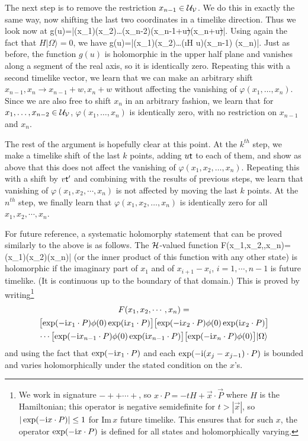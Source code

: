 \documentclass[12pt]{article}
\def\ra{\rangle}
\numberwithin{equation}{section}
\begin{document}
The next step is to remove the restriction $x_{n-1}\in{\mathcal U}_{\mathcal V}$.   We do this in exactly the same way, now shifting the last two coordinates
in a timelike direction.  Thus  we look now at
\be\label{urfu}g(u)=\langle\chi|\phi(x_1)\phi(x_2)\dots \phi(x_{n-2})\phi(x_{n-1}+u\st)\phi(x_n+u\st)|\Omega\rangle.\ee
Using again the fact that $H|\Omega\rangle=0$, we have
\be\label{rfu}g(u)=\langle\chi|\phi(x_1)\phi(x_2)\dots \exp(\i H u)\phi(x_{n-1}) \phi(x_n)|\Omega\rangle .\ee
Just as before, the function $g(u)$ is holomorphic in the upper half plane and vanishes along a segment of the real axis, so it is
identically zero.  Repeating this with a second timelike vector, we learn that we can make an arbitrary shift $x_{n-1},x_n
\to x_{n-1}+w,x_n+w$ without  affecting the vanishing of $\varphi(x_1,\dots,x_n)$.  Since we are also free to shift $x_n$ in an arbitrary
fashion, we learn that for $x_1,\dots,x_{n-2}\in {\mathcal U}_{\mathcal V}$, $\varphi(x_1,\dots,x_{n})$ is identically zero, with no restriction on $x_{n-1}$ and $x_n$.

The rest of the argument is hopefully clear at this point.  At the $k^{th}$ step, we make a timelike shift of the last
$k$ points, adding $u{\sf t}$ to each of them, and show as above that this does not affect the vanishing of $\varphi(x_1,x_2,\dots,x_n)$.    Repeating this with a shift by $v{\sf t}'$ and combining with the results of previous steps, we learn that vanishing of $\varphi(x_1,x_2,\cdots,x_n)$ is
not affected by moving the last $k$ points.
At the $n^{th}$ step, we finally learn that $\varphi(x_1,x_2,\dots,x_n)$ is identically zero for all $x_1,x_2,\cdots,x_n$.

For future reference, a systematic holomorphy statement that can be proved similarly to the above is as follows.   The ${\mathcal H}$-valued function
\be\label{staval}  F(x_1,x_2,\cdots,x_n)=\phi(x_1)\phi(x_2)\cdots \phi(x_n)|\Omega \ra\ee
(or  the inner product of this function with any other state) is holomorphic if the imaginary part of 
$x_1$ and of $x_{i+1}-x_i$, $i=1,\cdots,n-1$
is future timelike.  (It is continuous up to the boundary of that domain.)  This is proved 
by writing\footnote{We work in signature $-++\cdots +$, so $x\cdot P=-tH+\vec x\cdot \vec P$ where $H$ is the Hamiltonian;
 this operator is negative semidefinite for $t>|\vec x|$, so $|\exp(-{\mathrm i} x\cdot P)|\leq 1$ for $\mathrm{Im}\,x$ future timelike. This ensures  that for such $x$,
 the operator
 $\exp(-{\mathrm i} x\cdot P)$ is defined for all states and holomorphically varying.}
\begin{multline}
\label{aval}F(x_1,x_2,\cdots,x_n) =  \\
 \bigl[\exp(-\i x_1\cdot P)\phi(0)\exp(\i x_1\cdot P)\bigr]
\bigl[\exp(-\i x_2\cdot P)\phi(0)\exp(\i x_2\cdot P)\bigr] \\
 \cdots\bigl[ \exp(-\i x_{n-1}\cdot P)\phi(0)\exp(\i x_{n-1}\cdot P)\bigr] 
 \bigl[\exp(-\i x_n\cdot P)\phi(0)\bigr]|\Omega\ra \end{multline}
and using the fact that  $\exp(-{\mathrm i} x_1\cdot P)$ and each $\exp(-{\mathrm i} (x_{j}-x_{j-1})\cdot P)$ is bounded and
varies holomorphically under the stated condition on the
$x$'s.
\end{document}
